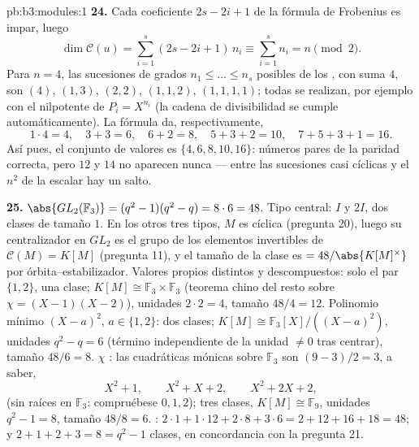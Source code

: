 \begin{solution}{pb:b3:modules:1}
\textbf{24.} Cada coeficiente $2s - 2i + 1$ de la fórmula de Frobenius
es impar, luego
\[
\dim\mathcal C(u) = \sum_{i=1}^s(2s - 2i + 1)\,n_i
\equiv \sum_{i=1}^s n_i = n \pmod 2 .
\]
Para $n = 4$, las sucesiones de grados $n_1 \leq \dots
\leq n_s$ posibles de los , con suma $4$, son $(4)$, $(1, 3)$, $(2, 2)$, $(1, 1, 2)$,
$(1, 1, 1, 1)$; todas se realizan, por ejemplo con el nilpotente de
$P_i = X^{n_i}$ (la cadena de divisibilidad se cumple automáticamente).
La fórmula da, respectivamente,
\[
1\cdot4 = 4, \quad 3 + 3 = 6, \quad 6 + 2 = 8, \quad
5 + 3 + 2 = 10, \quad 7 + 5 + 3 + 1 = 16 .
\]
Así pues, el conjunto de valores es $\{4, 6, 8, 10, 16\}$: números pares
de la paridad correcta, pero $12$ y $14$ no aparecen nunca --- entre las
sucesiones casi cíclicas y el $n^2$ de la escalar hay un salto.

\textbf{25.} $\abs{GL_2(\mathbb F_3)} = (q^2 - 1)(q^2 - q) =
8 \cdot 6 = 48$. Tipo central: $I$ y $2I$, dos clases de tamaño $1$. En
los otros tres tipos, $M$ es cíclica (pregunta 20), luego su
centralizador en $GL_2$ es el grupo de los elementos invertibles de
$\mathcal C(M) = K[M]$ (pregunta 11), y el tamaño de la clase es
$=48/\abs{K[M]^\times}$ por órbita--estabilizador. Valores propios
distintos y descompuestos: solo el par $\{1, 2\}$, una clase; $K[M]
\cong \mathbb F_3 \times \mathbb F_3$ (teorema chino del resto sobre
$\chi = (X-1)
(X-2)$), unidades $2 \cdot 2 = 4$, tamaño $48/4 = 12$. Polinomio mínimo
$(X - a)^2$, $a \in \{1, 2\}$: dos clases; $K[M] \cong
\mathbb F_3[X]/((X-a)^2)$, unidades $q^2 - q = 6$ (término independiente
de la unidad $\neq 0$ tras centrar), tamaño $48/6 = 8$. $\chi$
: las cuadráticas mónicas
 sobre $\mathbb F_3$ son
$(9 - 3)/2 = 3$, a saber,
\[
X^2 + 1, \qquad X^2 + X + 2, \qquad X^2 + 2X + 2,
\]
(sin raíces en $\mathbb F_3$: compruébese $0, 1, 2$); tres clases,
$K[M] \cong \mathbb F_9$, unidades $q^2 - 1 = 8$, tamaño $48/8 =
6$. :
$2\cdot1 + 1\cdot12 + 2\cdot8 + 3\cdot6 =
2 + 12 + 16 + 18 = 48$; y $2 + 1 + 2 + 3 = 8 = q^2 - 1$ clases, en
concordancia con la pregunta 21.
\end{solution}
